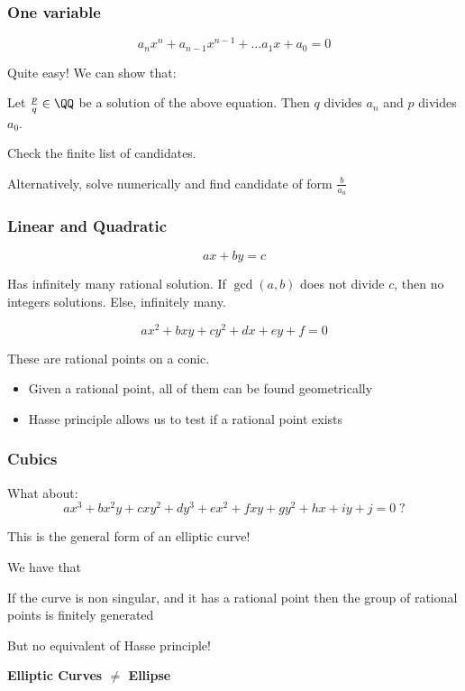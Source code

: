 \documentclass{beamer}
\begin{document}
\begin{frame}
    \frametitle{One variable}
    \[ a_n x^n + a_{n-1} x^{n-1} + \dots a_1 x + a_0 = 0 \]
    
    Quite easy! We can show that:
    \begin{theorem}
        Let $\frac{p}{q} \in \QQ$ be a solution of the above equation. 
        Then $q$ divides $a_n$ and $p$ divides $a_0$.
    \end{theorem}
    
    Check the finite list of candidates.

    Alternatively, solve numerically and find candidate of form $\frac{b}{a_n}$
\end{frame}

\begin{frame}
    \frametitle{Linear and Quadratic}
    \[ a x + b y = c \]
    
    \begin{theorem}
        Has infinitely many rational solution. If $\gcd(a, b)$ does not divide $c$, then no integers solutions.
        Else, infinitely many.
    \end{theorem}
    
    \[ a x^2 + b x y + c y^2  + d x + e y + f = 0 \]
    
    These are rational points on a conic. 
    \begin{itemize}
        \item Given a rational point, all of them can be found geometrically
        \item Hasse principle allows us to test if a rational point exists
    \end{itemize}

\end{frame}

\begin{frame}
    \frametitle{Cubics}
    What about:
    \[ a x^3 + b x^2 y + c x y^2 + d y^3 + e x^2 + f x y + g y^2 + h x + i y + j = 0 \; ? \]
    
    This is the general form of an elliptic curve!
    
    We have that 
    \begin{theorem}[Mordell]
        If the curve is non singular, and it has a rational point then the group of rational points is finitely generated
    \end{theorem}
    
    But no equivalent of Hasse principle!
    
    \begin{center}
        \textbf{Elliptic Curves $\neq$ Ellipse}
    \end{center}
\end{frame}
\end{document}
